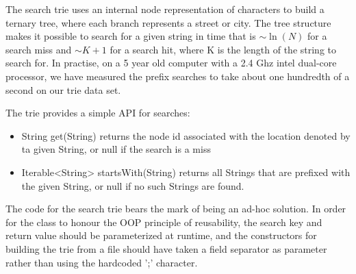 The search trie uses an internal node representation of characters to build a ternary tree, where each branch represents a street or city.
The tree structure makes it possible to search for a given string in time that is $\sim\ln(N)$ for a search miss and  $\sim K+1$ for a search hit, where K is the length of the string to search for.
In practise, on a 5 year old computer with a 2.4 Ghz intel dual-core processor, we have measured the prefix searches to take about one hundredth of a second on our trie data set.

The trie  provides a simple API for searches:
\begin{itemize}
	\item String get(String) returns the node id associated with the location denoted by ta given String, or null if the search is a miss
	\item Iterable<String> startsWith(String) returns all Strings that are prefixed with the given String, or null if no such Strings are found.
\end{itemize}

The code for the search trie bears the mark of being an ad-hoc solution. In order for the class to honour the OOP principle of reusability, the search key and return value should be parameterized at runtime, and the constructors for building the trie from a file should have taken a field separator as parameter rather than using the hardcoded ';' character.
